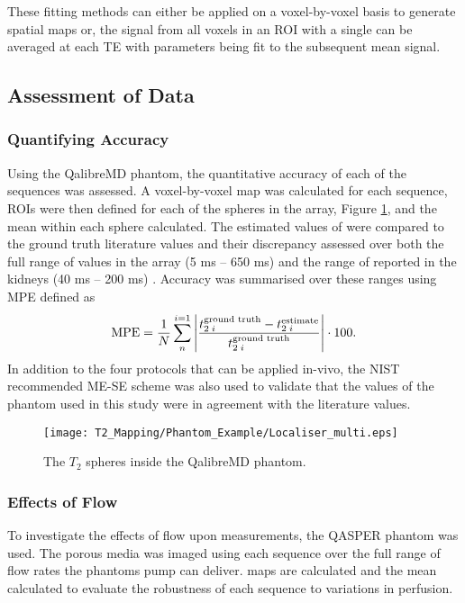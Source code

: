 These fitting methods can either be applied on a voxel-by-voxel basis to generate spatial maps or, the signal from all voxels in an \ac{ROI} with a single \ttwo can be averaged at each \ac{TE} with parameters being fit to the subsequent mean signal. 

\subsection{Assessment of Data}

\subsubsection{Quantifying Accuracy}
Using the QalibreMD phantom, the quantitative accuracy of each of the sequences was assessed. A voxel-by-voxel \ttwo map was calculated for each sequence, \acp{ROI} were then defined for each of the spheres in the \ttwo array, Figure \ref{fig:t2_phantom_loc}, and the mean \ttwo within each sphere calculated. The estimated values of \ttwo were compared to the ground truth literature values and their discrepancy assessed over both the full range of \ttwo values in the array (5 ms – 650 ms) and the range of \ttwo reported in the kidneys (40 ms – 200 ms) \cite{wolf_magnetic_2018}. Accuracy was summarised over these ranges using \ac{MPE} defined as 
\begin{equation}
	\textup{MPE} = \frac{1}{N}\sum_{n}^{i=1}\left|  \frac{t_{2\; i}^{\textup{ground truth}} - t_{2\; i}^{\textup{estimate}}}{t_{2\; i}^{\textup{ground truth}}}\right| \cdot 100.
	\label{eq:t2_MPE}
\end{equation}
In addition to the four protocols that can be applied in-vivo, the \ac{NIST} recommended ME-SE scheme was also used to validate that the \ttwo values of the phantom used in this study were in agreement with the literature values.

\begin{figure}[H]
	\centering
	\texttt{[image: T2\_Mapping/Phantom\_Example/Localiser\_multi.eps]}
	\caption{The $T_2$ spheres inside the QalibreMD phantom.}
	\label{fig:t2_phantom_loc}	
\end{figure}

\subsubsection{Effects of Flow}
To investigate the effects of flow upon \ttwo measurements, the \ac{QASPER} phantom was used. The porous media was imaged using each sequence over the full range of flow rates the phantoms pump can deliver. \ttwo maps are calculated and the mean \ttwo calculated to evaluate the robustness of each sequence to variations in perfusion.

